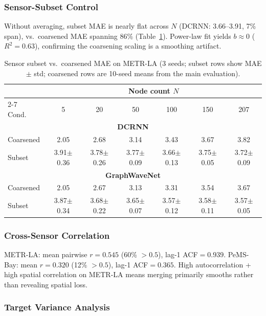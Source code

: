 \documentclass[sigconf]{acmart}
\begin{document}
\subsubsection{Sensor-Subset Control}

Without averaging, subset MAE is nearly flat across $N$ (DCRNN: 3.66--3.91, 7\% span), vs.\ coarsened MAE spanning 86\% (Table~\ref{tab:subset}). Power-law fit yields $b \approx 0$ ($R^2 = 0.63$), confirming the coarsening scaling is a smoothing artifact.

\begin{table}[t]
\small
\centering
\caption{Sensor subset vs.\ coarsened MAE on METR-LA (3 seeds; subset rows show MAE $\pm$ std; coarsened rows are 10-seed means from the main evaluation).}
\label{tab:subset}
\begin{tabular}{lcccccc}
\toprule
& \multicolumn{6}{c}{Node count $N$} \\
\cmidrule(lr){2-7}
Cond.\ & 5 & 20 & 50 & 100 & 150 & 207 \\
\midrule
\multicolumn{7}{c}{\textbf{DCRNN}} \\
Coarsened & 2.05 & 2.68 & 3.14 & 3.43 & 3.67 & 3.82 \\
Subset    & 3.91{\scriptsize$\pm$0.36} & 3.78{\scriptsize$\pm$0.26} & 3.77{\scriptsize$\pm$0.09} & 3.66{\scriptsize$\pm$0.13} & 3.75{\scriptsize$\pm$0.05} & 3.72{\scriptsize$\pm$0.09} \\
\midrule
\multicolumn{7}{c}{\textbf{GraphWaveNet}} \\
Coarsened & 2.05 & 2.67 & 3.13 & 3.31 & 3.54 & 3.67 \\
Subset    & 3.87{\scriptsize$\pm$0.34} & 3.68{\scriptsize$\pm$0.22} & 3.65{\scriptsize$\pm$0.07} & 3.57{\scriptsize$\pm$0.12} & 3.58{\scriptsize$\pm$0.11} & 3.57{\scriptsize$\pm$0.05} \\
\bottomrule
\end{tabular}
\end{table}

\subsubsection{Cross-Sensor Correlation}

METR-LA: mean pairwise $r{=}0.545$ (60\% ${>}0.5$), lag-1 ACF${=}0.939$. PeMS-Bay: mean $r{=}0.320$ (12\% ${>}0.5$), lag-1 ACF${=}0.365$. High autocorrelation + high spatial correlation on METR-LA means merging primarily smooths rather than revealing spatial loss.

\subsubsection{Target Variance Analysis}
\end{document}

